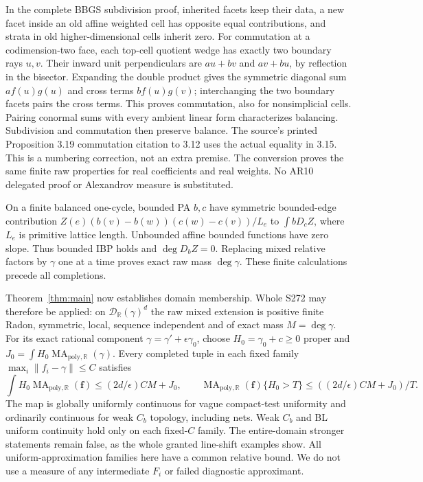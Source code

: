 \documentclass[11pt]{article}
\newcommand{\R}{\mathbb R}
\newcommand{\MA}{\operatorname{MA}_{\mathrm{poly},\R}}
\newcommand{\Dcal}{\mathcal D_{\R}(\gamma)}
\begin{document}
In the complete BBGS subdivision proof, inherited facets keep their data, a new facet inside an old affine weighted cell has opposite equal contributions, and strata in old higher-dimensional cells inherit zero. For commutation at a codimension-two face, each top-cell quotient wedge has exactly two boundary rays $u,v$. Their inward unit perpendiculars are $a u+b v$ and $a v+b u$, by reflection in the bisector. Expanding the double product gives the symmetric diagonal sum $a f(u)g(u)$ and cross terms $b f(u)g(v)$; interchanging the two boundary facets pairs the cross terms. This proves commutation, also for nonsimplicial cells. Pairing conormal sums with every ambient linear form characterizes balancing. Subdivision and commutation then preserve balance. The source's printed Proposition 3.19 commutation citation to 3.12 uses the actual equality in 3.15. This is a numbering correction, not an extra premise. The conversion proves the same finite raw properties for real coefficients and real weights. No AR10 delegated proof or Alexandrov measure is substituted.

On a finite balanced one-cycle, bounded PA $b,c$ have symmetric bounded-edge contribution
$Z(e)(b(v)-b(w))(c(w)-c(v))/L_e$ to $\int bD_cZ$, where $L_e$ is primitive lattice length. Unbounded affine bounded functions have zero slope. Thus bounded IBP holds and $\deg D_bZ=0$. Replacing mixed relative factors by $\gamma$ one at a time proves exact raw mass $\deg\gamma$. These finite calculations precede all completions.

Theorem~\ref{thm:main} now establishes domain membership. Whole S272 may therefore be applied: on $\Dcal^d$ the raw mixed extension is positive finite Radon, symmetric, local, sequence independent and of exact mass $M=\deg\gamma$. For its exact rational component $\gamma=\gamma'+\epsilon\gamma_0$, choose $H_0=\gamma_0+c\geq0$ proper and $J_0=\int H_0\MA(\gamma)$. Every completed tuple in each fixed family $\max_i\|f_i-\gamma\|\leq C$ satisfies
\[
 \int H_0\MA(\mathbf f)\leq(2d/\epsilon)CM+J_0,
 \qquad\MA(\mathbf f)\{H_0>T\}\leq((2d/\epsilon)CM+J_0)/T.
\]
The map is globally uniformly continuous for vague compact-test uniformity and ordinarily continuous for weak $C_b$ topology, including nets. Weak $C_b$ and BL uniform continuity hold only on each fixed-$C$ family. The entire-domain stronger statements remain false, as the whole granted line-shift examples show. All uniform-approximation families here have a common relative bound. We do not use a measure of any intermediate $F_i$ or failed diagnostic approximant.
\end{document}
